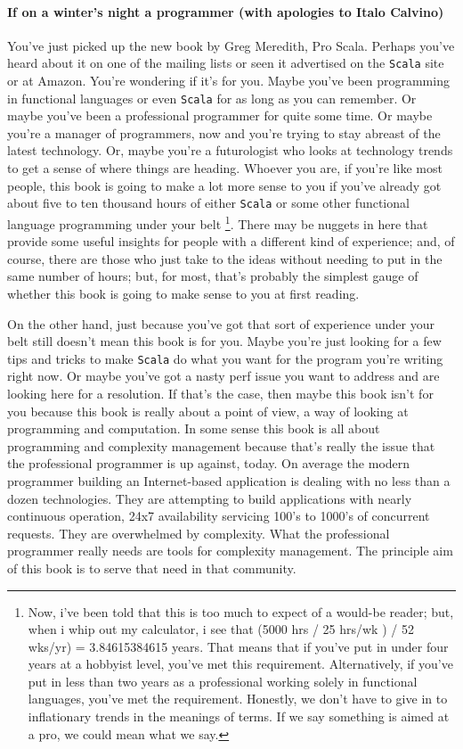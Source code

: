 \paragraph{If on a winter's night a programmer (with apologies to Italo Calvino)} 
You've just picked up the new book by Greg Meredith, Pro
Scala. Perhaps you've heard about it on one of the mailing lists or
seen it advertised on the \texttt{Scala} site or at Amazon. You're
wondering if it's for you. Maybe you've been programming in functional
languages or even \texttt{Scala} for as long as you can remember. Or
maybe you've been a professional programmer for quite some time. Or
maybe you're a manager of programmers, now and you're trying to stay
abreast of the latest technology. Or, maybe you're a futurologist who
looks at technology trends to get a sense of where things are
heading. Whoever you are, if you're like most people, this book is
going to make a lot more sense to you if you've already got about five
to ten thousand hours of either \texttt{Scala} or some other
functional language programming under your belt \footnote{ Now, i've
been told that this is too much to expect of a would-be reader; but,
when i whip out my calculator, i see that (5000 hrs / 25 hrs/wk ) / 52
wks/yr) = 3.84615384615 years. That means that if you've put in under
four years at a hobbyist level, you've met this
requirement. Alternatively, if you've put in less than two years as a
professional working solely in functional languages, you've met the
requirement. Honestly, we don't have to give in to inflationary trends
in the meanings of terms. If we say something is aimed at a pro, we
could mean what we say. }. There may be nuggets in here that provide
some useful insights for people with a different kind of experience;
and, of course, there are those who just take to the ideas without
needing to put in the same number of hours; but, for most, that's
probably the simplest gauge of whether this book is going to make
sense to you at first reading.

On the other hand, just because you've got that sort of experience
under your belt still doesn't mean this book is for you. Maybe you're
just looking for a few tips and tricks to make \texttt{Scala} do what
you want for the program you're writing right now. Or maybe you've got
a nasty perf issue you want to address and are looking here for a
resolution. If that's the case, then maybe this book isn't for you
because this book is really about a point of view, a way of looking at
programming and computation. In some sense this book is all about
programming and complexity management because that's really the issue
that the professional programmer is up against, today. On average the
modern programmer building an Internet-based application is dealing
with no less than a dozen technologies. They are attempting to build
applications with nearly continuous operation, 24x7 availability
servicing 100's to 1000's of concurrent requests. They are overwhelmed
by complexity. What the professional programmer really needs are tools
for complexity management. The principle aim of this book is to serve
that need in that community.

